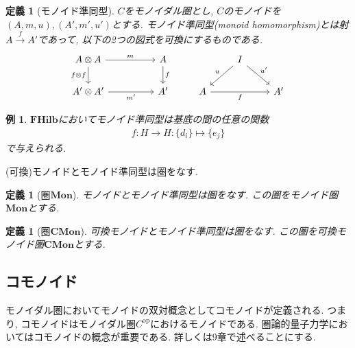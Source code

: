 \documentclass[a4paper,12pt]{ltjsarticle}
\theoremstyle{break}
\newtheorem{defn}[thm]{定義}
\newtheorem{eg}[thm]{例}
\newcommand{\fhilb}{\mathbf{FHilb}}
\newcommand{\mon}{\mathbf{Mon}}
\newcommand{\cmon}{\mathbf{CMon}}
\newcommand{\Op}{\mathrm{op}}
\newcommand{\xr}[1]{\xrightarrow{#1}}
\newcommand{\mt}{\mapsto}
\newcommand{\ot}{\otimes}
\numberwithin{equation}{section}
\begin{document}
\begin{defn}[モノイド準同型]
  $C$をモノイダル圏とし, $C$のモノイドを$(A,m,u), (A',m',u')$とする. 
  モノイド準同型(monoid homomorphism)とは射$A \xr{f} A'$であって, 以下の2つの図式を可換にするものである. 
  \[\begin{tikzcd}
    {A \ot A} && A && I \\
    {A' \ot A'} && {A'} & A && {A'}
    \arrow["m", from=1-1, to=1-3]
    \arrow["f", from=1-3, to=2-3]
    \arrow["{f \ot f}"', from=1-1, to=2-1]
    \arrow["{m'}"', from=2-1, to=2-3]
    \arrow["u"', from=1-5, to=2-4]
    \arrow["f"', from=2-4, to=2-6]
    \arrow["{u'}", from=1-5, to=2-6]
  \end{tikzcd}\]
\end{defn}

\begin{eg}
  $\fhilb$においてモノイド準同型は基底の間の任意の関数
  \begin{align*}
    f: H \to H: \{d_i\} \mt \{e_j\}
  \end{align*}
  で与えられる.  
\end{eg}

(可換)モノイドとモノイド準同型は圏をなす. 

\begin{defn}[圏$\mon$]
  モノイドとモノイド準同型は圏をなす. 
  この圏をモノイド圏$\mon$とする. 
\end{defn}

\begin{defn}[圏$\cmon$]
  可換モノイドとモノイド準同型は圏をなす. 
  この圏を可換モノイド圏$\cmon$とする. 
\end{defn}

\subsection{コモノイド}

モノイダル圏においてモノイドの双対概念としてコモノイドが定義される. 
つまり, コモノイドはモノイダル圏$C^\Op$におけるモノイドである. 
圏論的量子力学においてはコモノイドの概念が重要である.
詳しくは9章で述べることにする.  
\end{document}
